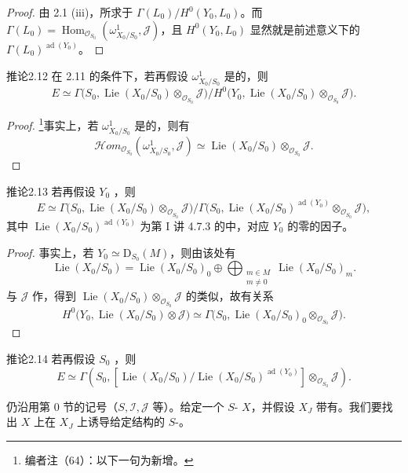 \begin{proof}
由 2.1 (iii)，所求于 $\Gamma(L_0)/H^0(Y_0,L_0)$。而 $\Gamma(L_0)=\operatorname{Hom}_{\mathcal O_{S_0}}(\omega^1_{X_0/S_0},\mathcal J)$，且 $H^0(Y_0,L_0)$ 显然就是前述意义下的 $\Gamma(L_0)^{\operatorname{ad}(Y_0)}$。
\end{proof}
\begin{SGAresult}{推论}{2.12}
在 2.11 的条件下，若再假设 $\omega^1_{X_0/S_0}$ 是的，则
\[
 E\simeq\Gamma\bigl(S_0,\operatorname{Lie}(X_0/S_0)\otimes_{\mathcal O_{S_0}}\mathcal J\bigr)
 \big/H^0\bigl(Y_0,\operatorname{Lie}(X_0/S_0)\otimes_{\mathcal O_{S_0}}\mathcal J\bigr).
\]
\end{SGAresult}
\begin{proof}
\footnote{编者注（64）：以下一句为新增。}事实上，若 $\omega^1_{X_0/S_0}$ 是的，则有
\[
 \mathscr{H}\!om_{\mathcal O_{S_0}}(\omega^1_{X_0/S_0},\mathcal J)
 \simeq\operatorname{Lie}(X_0/S_0)\otimes_{\mathcal O_{S_0}}\mathcal J.
\]
\end{proof}
\begin{SGAresult}{推论}{2.13}
若再假设 $Y_0$ ，则
\[
 E\simeq\Gamma\bigl(S_0,\operatorname{Lie}(X_0/S_0)\otimes_{\mathcal O_{S_0}}\mathcal J\bigr)
 \big/\Gamma\bigl(S_0,\operatorname{Lie}(X_0/S_0)^{\operatorname{ad}(Y_0)}\otimes_{\mathcal O_{S_0}}\mathcal J\bigr),
\]
其中 $\operatorname{Lie}(X_0/S_0)^{\operatorname{ad}(Y_0)}$ 为第 I 讲 4.7.3 的中，对应 $Y_0$ 的零的因子。
\end{SGAresult}
\begin{proof}
事实上，若 $Y_0\simeq\mathrm D_{S_0}(M)$，则由该处有
\[
 \operatorname{Lie}(X_0/S_0)=\operatorname{Lie}(X_0/S_0)_0
 \oplus\bigoplus_{\substack{m\in M\\m\ne0}}\operatorname{Lie}(X_0/S_0)_m.
\]
与 $\mathcal J$ 作，得到 $\operatorname{Lie}(X_0/S_0)\otimes_{\mathcal O_{S_0}}\mathcal J$ 的类似，故有关系
\[
 H^0\bigl(Y_0,\operatorname{Lie}(X_0/S_0)\otimes\mathcal J\bigr)
 \simeq\Gamma\bigl(S_0,\operatorname{Lie}(X_0/S_0)_0\otimes_{\mathcal O_{S_0}}\mathcal J\bigr).
\]
\end{proof}
\begin{SGAresult}{推论}{2.14}
若再假设 $S_0$ ，则
\[
 E\simeq\Gamma\left(S_0,
 \left[\operatorname{Lie}(X_0/S_0)/\operatorname{Lie}(X_0/S_0)^{\operatorname{ad}(Y_0)}\right]
 \otimes_{\mathcal O_{S_0}}\mathcal J\right).
\]
\end{SGAresult}
仍沿用第 0 节的记号（$S,\mathcal I,\mathcal J$ 等）。给定一个 $S$- $X$，并假设 $X_J$ 带有。我们要找出 $X$ 上在 $X_J$ 上诱导给定结构的 $S$-。


